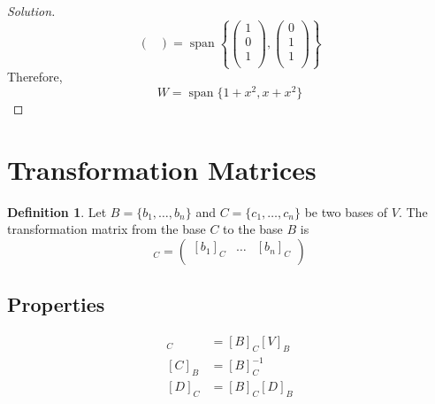 \documentclass[fleqn, a4paper, 12pt]{article}
\theoremstyle{definition}
\newtheorem{definition}{Definition}
\theoremstyle{theorem}
\newenvironment{solution}
{\begin{proof}[Solution]\let\qed\relax}
	{\end{proof}}
\DeclareMathOperator{\vspan}{\mathrm{span}} %
\begin{document}
\begin{solution}
\begin{equation*}
\begin{pmatrix}
		\end{pmatrix}
		= \vspan 
		\left\lbrace 
			\begin{pmatrix}
				1\\
				0\\
				1\\
			\end{pmatrix}
			,
			\begin{pmatrix}
				0\\
				1\\
				1\\
			\end{pmatrix}
		\right\rbrace 
	\end{equation*}
	Therefore,
	\begin{equation*}
		W = \vspan\{1 + x^2, x + x^2\}
	\end{equation*}
\end{solution}

\section{Transformation Matrices}

\begin{definition}
	Let $B = \{b_1, \dots, b_n\}$ and $C= \{c_1, \dots, c_n\}$ be two bases of $V$. The transformation matrix from the base $C$ to the base $B$ is
	\begin{equation*}
		[B]_C = 
		\begin{pmatrix}
			[b_1]_C & \dots & [b_n]_C\\
		\end{pmatrix}
	\end{equation*}
\end{definition}

\subsection{Properties}

\begin{align*}
	[V]_C &= [B]_C [V]_B\\
	[C]_B &= [B]^{-1}_C\\
	[D]_C &= [B]_C [D]_B
\end{align*}
\end{document}
